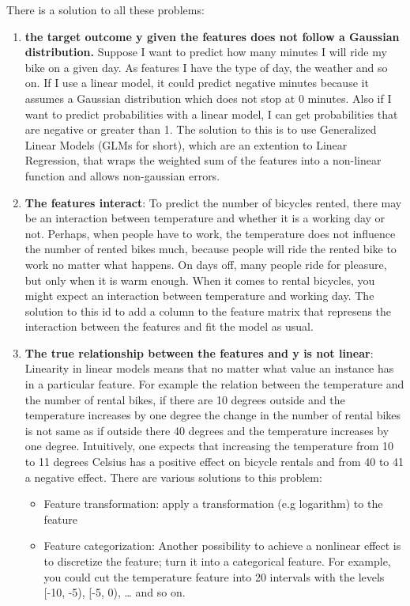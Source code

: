 There is a solution to all these problems:
\begin{enumerate}
    \item \textbf{the target outcome y given the features does not follow a Gaussian distribution.} 
    Suppose I want to predict how many minutes I will ride my bike on a given day. As features I have the type of day, the weather and so on. If I use a linear model, it could predict negative minutes because it assumes a Gaussian distribution which does not stop at 0 minutes. Also if I want to predict probabilities with a linear model, I can get probabilities that are negative or greater than 1. 
    The solution to this is to use Generalized Linear Models (GLMs for short), which are an extention to Linear Regression, that wraps the weighted sum of the features into a non-linear function and allows non-gaussian errors.
    \item \textbf{The features interact}: To predict the number of bicycles rented, there may be an interaction between temperature and whether it is a working day or not. Perhaps, when people have to work, the temperature does not influence the number of rented bikes much, because people will ride the rented bike to work no matter what happens. On days off, many people ride for pleasure, but only when it is warm enough. When it comes to rental bicycles, you might expect an interaction between temperature and working day.
    The solution to this id to add a column to the feature matrix that represens the interaction between the features and fit the model as usual.
    \item \textbf{The true relationship between the features and y is not linear}:  Linearity in linear models means that no matter what value an instance has in a particular feature. For example the relation between the temperature and the number of rental bikes, if there are 10 degrees outside and the temperature increases by one degree the change in the number of rental bikes is not same as if outside there 40 degrees and the temperature increases by one degree.
    Intuitively, one expects that increasing the temperature from 10 to 11 degrees Celsius has a positive effect on bicycle rentals and from 40 to 41 a negative effect. There are various solutions to this problem: 
    \begin{itemize}
        \item Feature transformation: apply a transformation (e.g logarithm) to the feature
        \item Feature categorization: Another possibility to achieve a nonlinear effect is to discretize the feature; turn it into a categorical feature. For example, you could cut the temperature feature into 20 intervals with the levels [-10, -5), [-5, 0), … and so on.

\end{itemize}
\end{enumerate}
